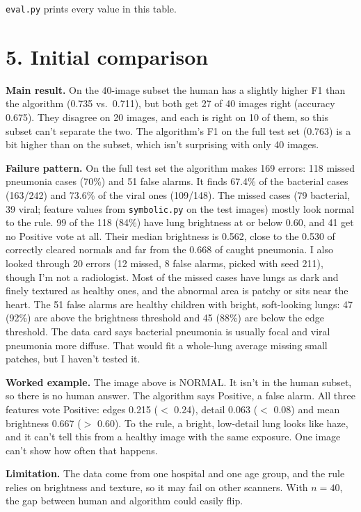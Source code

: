 \documentclass[11pt,letterpaper]{article}
\begin{document}
\texttt{eval.py} prints every value in this table.

\section{5. Initial comparison}

\textbf{Main result.} On the 40-image subset the human has a slightly higher F1 than the algorithm (0.735 vs.\ 0.711), but both get 27 of 40 images right (accuracy 0.675). They disagree on 20 images, and each is right on 10 of them, so this subset can't separate the two. The algorithm's F1 on the full test set (0.763) is a bit higher than on the subset, which isn't surprising with only 40 images.

\textbf{Failure pattern.} On the full test set the algorithm makes 169 errors: 118 missed pneumonia cases (70\%) and 51 false alarms. It finds 67.4\% of the bacterial cases (163/242) and 73.6\% of the viral ones (109/148). The missed cases (79 bacterial, 39 viral; feature values from \texttt{symbolic.py} on the test images) mostly look normal to the rule. 99 of the 118 (84\%) have lung brightness at or below 0.60, and 41 get no Positive vote at all. Their median brightness is 0.562, close to the 0.530 of correctly cleared normals and far from the 0.668 of caught pneumonia. I also looked through 20 errors (12 missed, 8 false alarms, picked with seed 211), though I'm not a radiologist. Most of the missed cases have lungs as dark and finely textured as healthy ones, and the abnormal area is patchy or sits near the heart. The 51 false alarms are healthy children with bright, soft-looking lungs: 47 (92\%) are above the brightness threshold and 45 (88\%) are below the edge threshold. The data card says bacterial pneumonia is usually focal and viral pneumonia more diffuse. That would fit a whole-lung average missing small patches, but I haven't tested it.

\textbf{Worked example.} The image above is NORMAL. It isn't in the human subset, so there is no human answer. The algorithm says Positive, a false alarm. All three features vote Positive: edges 0.215 ($<$ 0.24), detail 0.063 ($<$ 0.08) and mean brightness 0.667 ($>$ 0.60). To the rule, a bright, low-detail lung looks like haze, and it can't tell this from a healthy image with the same exposure. One image can't show how often that happens.

\textbf{Limitation.} The data come from one hospital and one age group, and the rule relies on brightness and texture, so it may fail on other scanners. With $n = 40$, the gap between human and algorithm could easily flip.
\end{document}
